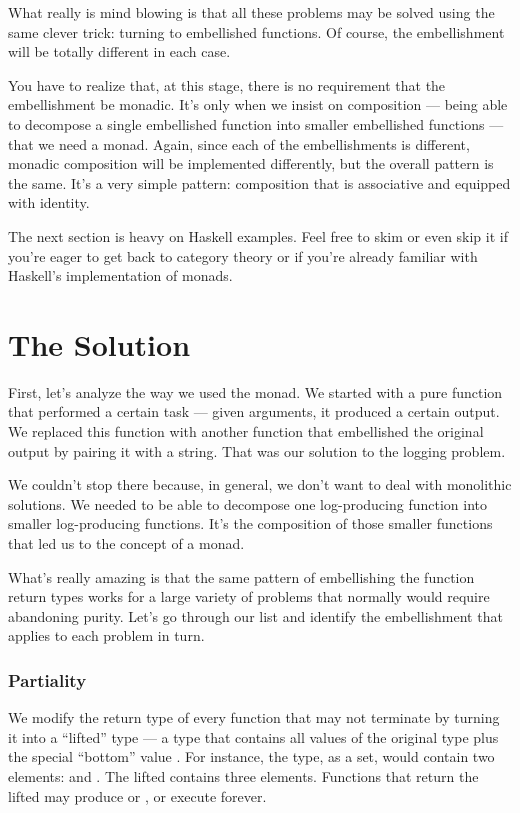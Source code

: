 What really is mind blowing is that all these problems may be solved
using the same clever trick: turning to embellished functions. Of
course, the embellishment will be totally different in each case.

You have to realize that, at this stage, there is no requirement that
the embellishment be monadic. It's only when we insist on composition
--- being able to decompose a single embellished function into smaller
embellished functions --- that we need a monad. Again, since each of the
embellishments is different, monadic composition will be implemented
differently, but the overall pattern is the same. It's a very simple
pattern: composition that is associative and equipped with identity.

The next section is heavy on Haskell examples. Feel free to skim or even
skip it if you're eager to get back to category theory or if you're
already familiar with Haskell's implementation of monads.

\section{The Solution}\label{the-solution}

First, let's analyze the way we used the  monad. We
started with a pure function that performed a certain task --- given
arguments, it produced a certain output. We replaced this function with
another function that embellished the original output by pairing it with
a string. That was our solution to the logging problem.

We couldn't stop there because, in general, we don't want to deal with
monolithic solutions. We needed to be able to decompose one
log-producing function into smaller log-producing functions. It's the
composition of those smaller functions that led us to the concept of a
monad.

What's really amazing is that the same pattern of embellishing the
function return types works for a large variety of problems that
normally would require abandoning purity. Let's go through our list and
identify the embellishment that applies to each problem in turn.

\subsubsection{Partiality}\label{partiality}

We modify the return type of every function that may not terminate by
turning it into a ``lifted'' type --- a type that contains all values of
the original type plus the special ``bottom'' value . For
instance, the  type, as a set, would contain two elements:
 and . The lifted  contains
three elements. Functions that return the lifted  may
produce  or , or execute forever.

